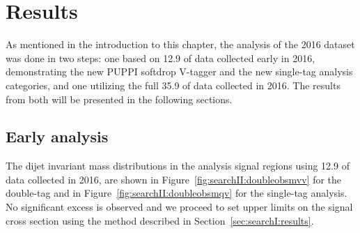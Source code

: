 \section{Results}   
As mentioned in the introduction to this chapter, the analysis of the 2016 dataset was done in two steps: one based on 12.9 \fbinv of data collected early in 2016, demonstrating the new PUPPI softdrop V-tagger and the new single-tag analysis categories, and one utilizing the full 35.9 \fbinv of data collected in 2016. The results from both will be presented in the following sections.

\subsection{Early analysis}   
\label{sec:searchII:b2g16021res}
The dijet invariant mass distributions in the analysis signal regions using 12.9 \fbinv of data collected in 2016, are shown in Figure~\ref{fig:searchII:doubleobsmvv} for the double-tag and in Figure~\ref{fig:searchII:doubleobsmqv} for the single-tag analysis. No significant excess is observed and we proceed to set upper limits on the signal cross section using the method described in Section~\ref{sec:searchI:results}.
